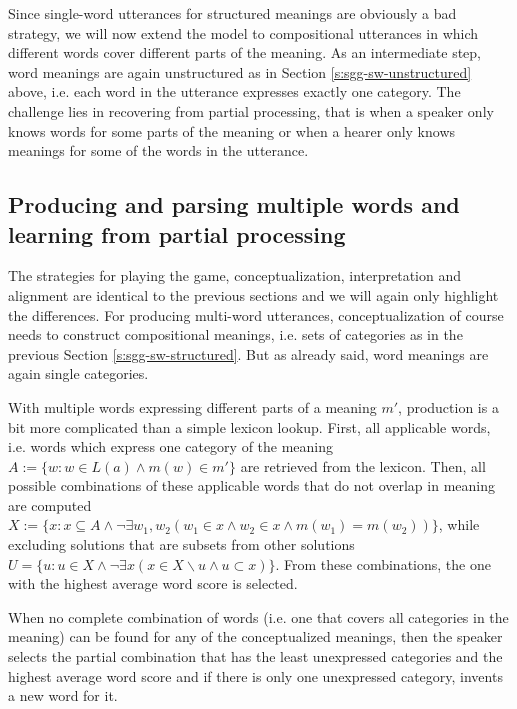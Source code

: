 Since single-word utterances for structured meanings are obviously a
bad strategy, we will now extend the model to compositional utterances
in which different words cover different parts of the meaning. As an
intermediate step, word meanings are again unstructured as in Section
\ref{s:sgg-sw-unstructured} above, i.e. each word in the utterance
expresses exactly one category. The challenge lies in recovering from
partial processing, that is when a speaker only knows words for some
parts of the meaning or when a hearer only knows meanings for some of
the words in the utterance.


\subsection{Producing and parsing multiple words and learning from
  partial processing}
\label{s:sgg-mw-unstructured-processing}

The strategies for playing the game, conceptualization, interpretation
and alignment are identical to the previous sections and we will again
only highlight the differences. For producing multi-word utterances,
conceptualization of course needs to construct compositional meanings,
i.e. sets of categories as in the previous Section
\ref{s:sgg-sw-structured}. But as already said, word meanings are
again single categories.

 With multiple words expressing different
parts of a meaning $m'$, production is a bit more complicated than a
simple lexicon lookup. First, all applicable words, i.e. words which
express one category of the meaning $A:=\{w: w \in L(a) \wedge m(w)
\in m'\}$ are retrieved from the lexicon. Then, all possible
combinations of these applicable words that do not overlap in meaning
are computed $X := \{x: x \subseteq A \wedge \neg\exists w_1,w_2 (w_1
\in x \wedge w_2 \in x \wedge m(w_1) = m(w_2))\}$, while excluding
solutions that are subsets from other solutions $U = \{u : u \in X
\wedge \neg \exists x (x \in X \backslash u \wedge u \subset
x)\}$. From these combinations, the one with the highest average word
score is selected.

 When no complete combination of words (i.e.
one that covers all categories in the meaning) can be found for any of
the conceptualized meanings, then the speaker selects the partial
combination that has the least unexpressed categories and the highest
average word score and if there is only one unexpressed category,
invents a new word for it.

